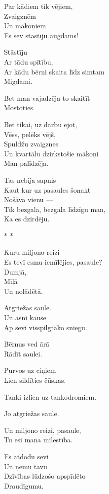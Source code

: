\documentclass[14pt]{extarticle}
\begin{document}
Par kādiem tik vējiem,\\
Zvaigznēm\\
Un mākoņiem\\
Es sev stāstīju augdams!

Stāstīju\\
Ar tādu spītību,\\
Ar kādu bērni skaita līdz simtam\\
Migdami.

Bet man vajadzēja to skaitīt\\
Mostoties.

Bet tikai, uz darbu ejot,\\
Vēss, pelēks vējš,\\
Spuldžu zvaigznes\\
Un kvartālu dzirkstošie mākoņi\\
Man palīdzēja.

Tas nebija sapnis\\
Kaut kur uz pasaules šonakt\\
Nošāva vienu ---\\
Tik bezgala, bezgala līdzīgu man,\\
Ka es dzirdēju.



\newpage

{\large \sc * * *}

Kuru miljono reizi\\
Es tevī esmu iemīlējies, pasaule?\\
Dumjā,\\
Mīļā\\
Un nolādētā.

Atgriežas saule.\\
Un asni kausē\\
Ap sevi visspilgtāko sniegu.

Bērnus ved ārā\\
Rādīt saulei.

Purvos uz ciņiem\\
Lien sildīties čūskas.

Tanki izlien uz tankodromiem.

Jo atgriežas saule.

Un miljono reizi, pasaule,\\
Tu esi mana mīlestība.

Es atdodu sevi\\
Un ņemu tavu\\
Dzīvības lūdzošo apspīdēto\\
Draudīgumu.

\newpage
\end{document}

